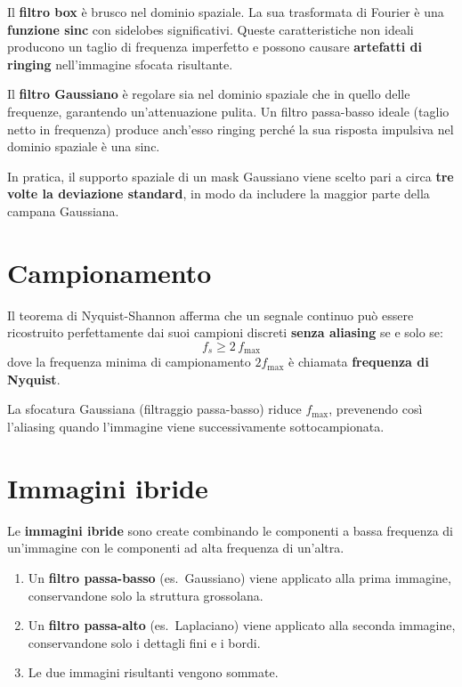 \documentclass[12pt, a4paper]{report}
\begin{document}
\begin{notebox}
Il \textbf{filtro box} è brusco nel dominio spaziale.  La sua trasformata di
Fourier è una \textbf{funzione sinc} con sidelobes significativi.  Queste
caratteristiche non ideali producono un taglio di frequenza imperfetto e possono
causare \textbf{artefatti di ringing} nell'immagine sfocata risultante.

Il \textbf{filtro Gaussiano} è regolare sia nel dominio spaziale che in quello
delle frequenze, garantendo un'attenuazione pulita.  Un filtro passa-basso ideale
(taglio netto in frequenza) produce anch'esso ringing perché la sua risposta
impulsiva nel dominio spaziale è una sinc.

In pratica, il supporto spaziale di un mask Gaussiano viene scelto pari a circa
\textbf{tre volte la deviazione standard}, in modo da includere la maggior parte
della campana Gaussiana.
\end{notebox}

\section{Campionamento}

\begin{propbox}
Il teorema di Nyquist-Shannon afferma che un segnale continuo può essere
ricostruito perfettamente dai suoi campioni discreti \textbf{senza aliasing} se e
solo se:
\[
  f_s \geq 2\,f_{\max}
\]
dove la frequenza minima di campionamento $2f_{\max}$ è chiamata
\textbf{frequenza di Nyquist}.
\end{propbox}

\begin{notebox}
La sfocatura Gaussiana (filtraggio passa-basso) riduce $f_{\max}$, prevenendo
così l'aliasing quando l'immagine viene successivamente sottocampionata.
\end{notebox}

\section{Immagini ibride}

Le \textbf{immagini ibride} sono create combinando le componenti a bassa frequenza
di un'immagine con le componenti ad alta frequenza di un'altra.

\begin{enumerate}
  \item Un \textbf{filtro passa-basso} (es.\ Gaussiano) viene applicato alla prima
        immagine, conservandone solo la struttura grossolana.
  \item Un \textbf{filtro passa-alto} (es.\ Laplaciano) viene applicato alla seconda
        immagine, conservandone solo i dettagli fini e i bordi.
  \item Le due immagini risultanti vengono sommate.
\end{enumerate}
\end{document}
